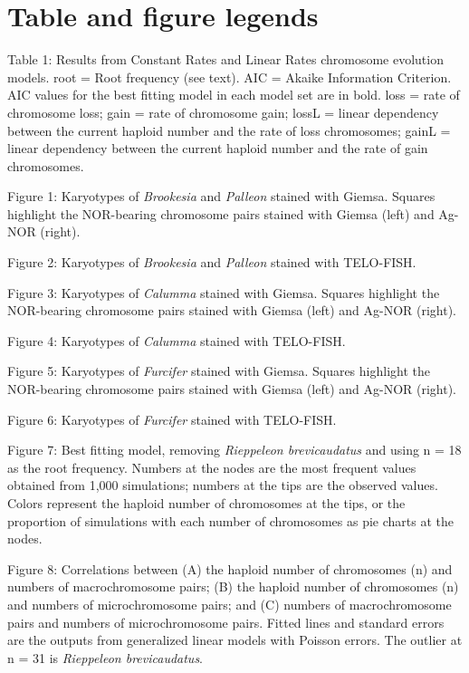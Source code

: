 \documentclass[a4paper, 12pt]{article}
\begin{document}
\newpage
\section{Table and figure legends}

Table 1: Results from Constant Rates and Linear Rates chromosome evolution models. root = Root frequency (see text). AIC = Akaike Information Criterion. AIC values for the best fitting model in each model set are in bold. loss = rate of chromosome loss; gain = rate of chromosome gain; lossL = linear dependency between the current haploid number and the rate of loss chromosomes; gainL = linear dependency between the current haploid number and the rate of gain chromosomes.

Figure 1: Karyotypes of \textit{Brookesia} and \textit{Palleon} stained with Giemsa. Squares highlight the NOR-bearing chromosome pairs stained with Giemsa (left) and Ag-NOR (right).

Figure 2: Karyotypes of \textit{Brookesia} and \textit{Palleon} stained with TELO-FISH.

Figure 3: Karyotypes of \textit{Calumma} stained with Giemsa. Squares highlight the NOR-bearing chromosome pairs stained with Giemsa (left) and Ag-NOR (right).

Figure 4: Karyotypes of \textit{Calumma} stained with TELO-FISH.

Figure 5: Karyotypes of \textit{Furcifer} stained with Giemsa. Squares highlight the NOR-bearing chromosome pairs stained with Giemsa (left) and Ag-NOR (right).

Figure 6: Karyotypes of \textit{Furcifer} stained with TELO-FISH.

Figure 7: Best fitting model, removing \textit{Rieppeleon brevicaudatus} and using n = 18 as the root frequency. Numbers at the nodes are the most frequent values obtained from 1,000 simulations; numbers at the tips are the observed values. Colors represent the haploid number of chromosomes at the tips, or the proportion of simulations with each number of chromosomes as pie charts at the nodes.

Figure 8: Correlations between (A) the haploid number of chromosomes (n) and numbers of macrochromosome pairs; (B) the haploid number of chromosomes (n) and numbers of microchromosome pairs; and (C) numbers of macrochromosome pairs and numbers of microchromosome pairs. Fitted lines and standard errors are the outputs from generalized linear models with Poisson errors. The outlier at n = 31 is \textit{Rieppeleon brevicaudatus}.
\end{document}
